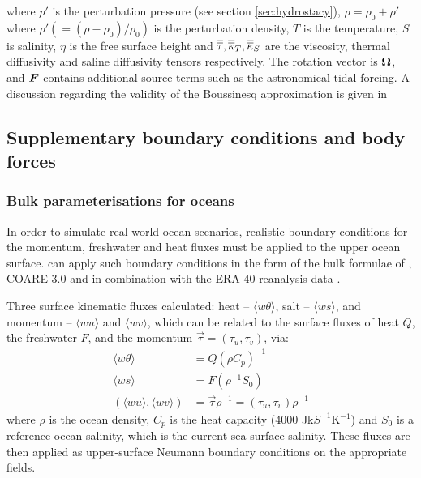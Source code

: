 where $p'$ is the perturbation pressure (see section \ref{sec:hydrostacy}),
$\rho=\rho_0+\rho'$ where $\rho'(=(\rho-\rho_0)/\rho_0)$ is the perturbation density,
$T$ is the temperature, $S$ is salinity, $\eta$ is the free surface height and
$\overline{\overline{\tau}},\overline{\overline{\kappa}}_T,\overline{\overline{\kappa}}_S$ are the viscosity, thermal diffusivity and saline
diffusivity tensors respectively.
The rotation vector is ${\mbox{\boldmath$\Omega$}}$, and ${\mbox{\boldmath$F$}}$ contains additional source terms such as the astronomical tidal forcing. A discussion
regarding the validity of the Boussinesq approximation is given in \cite{Gray1976}

\subsection{Supplementary boundary conditions and body forces}

\subsubsection{Bulk parameterisations for oceans}

In order to simulate real-world ocean scenarios, realistic boundary conditions for the momentum, freshwater and heat fluxes 
must be applied to the upper ocean surface. \fluidity can apply such boundary conditions in the form of the bulk formulae of \citet{large2004},
COARE 3.0 \citep{fairall2003} and \citet{kara2005} in combination with the ERA-40 reanalysis data \citep{Uppala2005}.

Three surface kinematic fluxes calculated: heat -- $\langle w\theta \rangle$,
salt -- $\langle ws \rangle$, and momentum -- $\langle wu \rangle$ and $\langle wv \rangle$,
which can be related to the surface fluxes of heat $Q$, the
freshwater $F$, and the momentum $\overrightarrow\tau=\left(\tau_u,\tau_v\right)$, via:
\begin{align}
\langle w\theta \rangle &= Q\left(\rho C_p \right)^{-1} \\
\langle ws \rangle &= F\left(\rho^{-1}S_0\right) \\
\left(\langle wu \rangle, \langle wv \rangle\right) &=
\overrightarrow{\tau}\rho^{-1} =
\left(\tau_u,\tau_v\right)\rho^{-1}
\end{align}
where $\rho$ is the ocean density, $C_p$ is the heat capacity (4000 Jk$S^{-1}$K$^{-1}$) 
and $S_0$ is a reference ocean salinity, which is the current sea surface salinity. 
These fluxes are then applied as upper-surface Neumann boundary conditions on
the appropriate fields.

